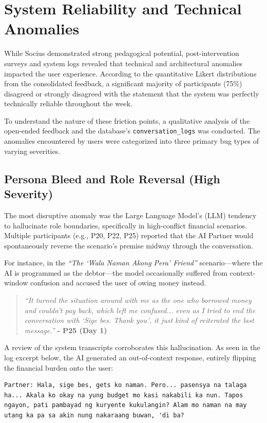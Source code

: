 \section{System Reliability and Technical Anomalies}

While Socius demonstrated strong pedagogical potential, post-intervention surveys and system logs revealed that technical and architectural anomalies impacted the user experience. According to the quantitative Likert distributions from the consolidated feedback, a significant majority of participants (75\%) disagreed or strongly disagreed with the statement that the system was perfectly technically reliable throughout the week.

To understand the nature of these friction points, a qualitative analysis of the open-ended feedback and the database's \texttt{conversation\_logs} was conducted. The anomalies encountered by users were categorized into three primary bug types of varying severities.

\subsection{Persona Bleed and Role Reversal (High Severity)}
The most disruptive anomaly was the Large Language Model's (LLM) tendency to hallucinate role boundaries, specifically in high-conflict financial scenarios. Multiple participants (e.g., P20, P22, P25) reported that the AI Partner would spontaneously reverse the scenario's premise midway through the conversation. 

For instance, in the \textit{``The `Wala Naman Akong Pera' Friend''} scenario---where the AI is programmed as the debtor---the model occasionally suffered from context-window confusion and accused the user of owing money instead.

\begin{quote}
\textit{``It turned the situation around with me as the one who borrowed money and couldn't pay back, which left me confused... even as I tried to end the conversation with `Sige bes. Thank you', it just kind of reiterated the last message.''} \textbf{- P25 (Day 1)}
\end{quote}

A review of the system transcripts corroborates this hallucination. As seen in the log excerpt below, the AI generated an out-of-context response, entirely flipping the financial burden onto the user:

\begin{lstlisting}[caption={Log Excerpt: Persona Bleed in Scenario 1 (Captured from P06, Day 3)}, label={lst:persona_bleed}]
Partner: Hala, sige bes, gets ko naman. Pero... pasensya na talaga ha... Akala ko okay na yung budget mo kasi nakabili ka nun. Tapos ngayon, pati pambayad ng kuryente kukulangin? Alam mo naman na may utang ka pa sa akin nung nakaraang buwan, 'di ba?
\end{lstlisting}

